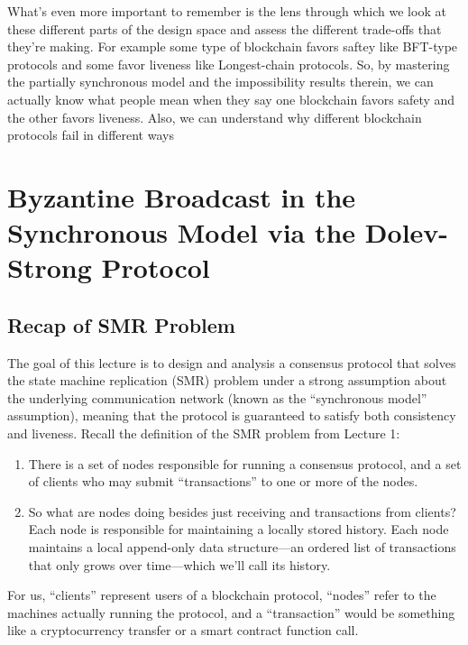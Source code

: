What's even more important to remember is the lens through which we look at these different parts of the design space and assess the different trade-offs that they're making. For example some type of blockchain favors saftey like BFT-type protocols and some favor liveness like Longest-chain protocols. So, by mastering the partially synchronous model and the impossibility results therein, we can actually know what people mean when they say one blockchain favors safety and the other favors liveness. Also, we can understand why different blockchain protocols fail in different ways



\chapter{Byzantine Broadcast in the
Synchronous Model via the
Dolev-Strong Protocol}

\section{Recap of SMR Problem}
The goal of this lecture is to design and analysis a consensus protocol that solves the state
machine replication (SMR) problem under a strong assumption about the underlying communication network (known as the “synchronous model” assumption), meaning that the
protocol is guaranteed to satisfy both consistency and liveness. Recall the definition of the
SMR problem from Lecture 1:\\

\begin{enumerate}
    \item There is a set of nodes responsible for running a consensus protocol, and a set of clients
who may submit “transactions” to one or more of the nodes. 

    \item So what are nodes doing besides just
receiving and transactions from clients?
Each node is
responsible for maintaining a locally
stored history. Each node maintains a local append-only data structure—an ordered list of transactions that only grows over time—which we’ll call its history.

\end{enumerate}

For us, “clients” represent users of a blockchain protocol, “nodes” refer to the machines
actually running the protocol, and a “transaction” would be something like a cryptocurrency
transfer or a smart contract function call.

